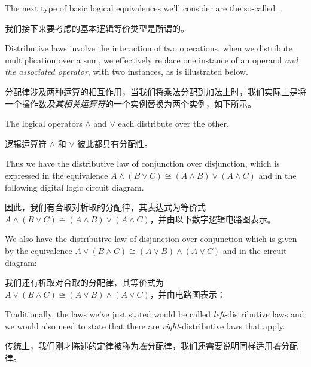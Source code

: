 The next type of basic logical equivalences we'll consider are the
so-called .

我们接下来要考虑的基本逻辑等价类型是所谓的。

Distributive laws involve the 
interaction of two operations, when we distribute multiplication 
over a sum, we effectively replace one instance of an operand {\em 
and the associated operator}, with two instances, as is illustrated
below.

分配律涉及两种运算的相互作用，当我们将乘法分配到加法上时，我们实际上是将一个操作数{\em 及其相关运算符}的一个实例替换为两个实例，如下所示。

\begin{center}

\end{center}   
  
The logical operators $\land$ and $\lor$ each distribute over the other.

逻辑运算符 $\land$ 和 $\lor$ 彼此都具有分配性。

Thus we have the distributive law of conjunction over disjunction, which
is expressed in the equivalence 
$A \land (B \lor C) \cong (A \land B) \lor (A \land C)$ 
and in the following digital logic circuit diagram.

因此，我们有合取对析取的分配律，其表达式为等价式 $A \land (B \lor C) \cong (A \land B) \lor (A \land C)$，并由以下数字逻辑电路图表示。

\begin{center}

\end{center}   

We also have the distributive law of disjunction over conjunction 
which is given by the equivalence 
$A \lor (B \land C) \cong (A \lor B) \land (A \lor C)$ and in the 
circuit diagram:

我们还有析取对合取的分配律，其等价式为 $A \lor (B \land C) \cong (A \lor B) \land (A \lor C)$，并由电路图表示：

\begin{center}

\end{center}   

Traditionally, the laws we've just stated would be called 
{\em left}-distributive laws and we would also need to state 
that there are {\em right}-distributive laws that apply.

传统上，我们刚才陈述的定律被称为{\em 左}分配律，我们还需要说明同样适用{\em 右}分配律。

